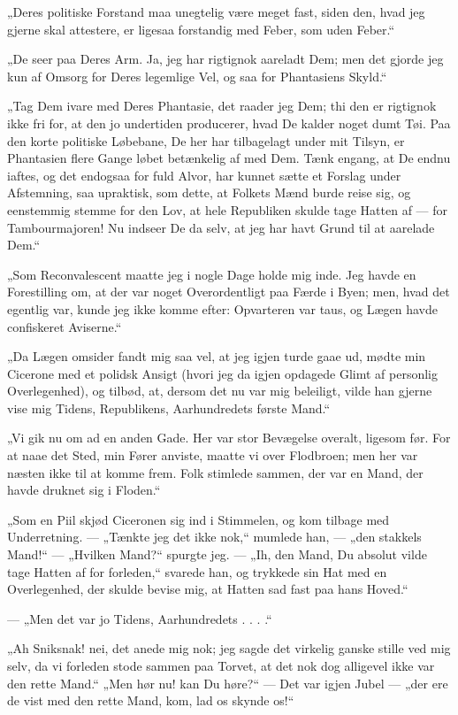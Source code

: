 \documentclass[12pt,a4paper]{book}
\newcommand{\apage}[1]{\marginnote{\footnotesize\textit{[#1]}}}
\begin{document}
„Deres politiske Forstand maa unegtelig være meget fast, siden den,
hvad jeg gjerne skal attestere, er ligesaa forstandig med Feber, som
uden Feber.“

„De seer paa Deres Arm. Ja, jeg har rigtignok aareladt Dem; men det
gjorde jeg kun af Omsorg for Deres legemlige Vel, og saa for
Phantasiens Skyld.“

„Tag Dem ivare med Deres Phantasie, det raader jeg Dem; thi den er
rigtignok ikke fri for, at den jo undertiden producerer, hvad De
kalder noget dumt Tøi. Paa den korte politiske Løbebane, De her har
tilbagelagt under mit Tilsyn, er Phantasien flere Gange løbet
betænkelig af med Dem. Tænk engang, at De endnu iaftes, og det
endogsaa for fuld Alvor, har kunnet sætte et Forslag under
Afstemning, saa upraktisk, som dette, at Folkets Mænd burde reise
sig, og eenstemmig stemme for den Lov, at hele Republiken skulde tage
Hatten af --- for Tambourmajoren! Nu indseer De da selv, at jeg har
havt Grund til at aarelade Dem.“

„Som Reconvalescent maatte jeg i nogle Dage holde mig inde. Jeg havde
en Forestilling om, at der var noget Overordentligt paa Færde i
Byen; men, hvad det egentlig var, kunde jeg ikke komme efter:
Opvarteren var taus, og Lægen havde confiskeret Aviserne.“

„Da Lægen omsider fandt mig saa vel, at jeg igjen turde gaae ud,
mødte min Cicerone med et polidsk Ansigt (hvori jeg da igjen
opdagede Glimt af personlig Overlegenhed), og \apage{61}
tilbød, at, dersom det nu var mig beleiligt, vilde han gjerne vise
mig Tidens, Republikens, Aarhundredets første Mand.“

„Vi gik nu om ad en anden Gade. Her var stor Bevægelse overalt,
ligesom før. For at naae det Sted, min Fører anviste, maatte vi over
Flodbroen; men her var næsten ikke til at komme frem. Folk stimlede
sammen, der var en Mand, der havde druknet sig i Floden.“

„Som en Piil skjød Ciceronen sig ind i Stimmelen, og kom tilbage med
Underretning. --- „Tænkte jeg det ikke nok,“ mumlede han, --- „den
stakkels Mand!“ --- „Hvilken Mand?“ spurgte jeg. --- „Ih, den Mand,
Du absolut vilde tage Hatten af for forleden,“ svarede han, og
trykkede sin Hat med en Overlegenhed, der skulde bevise mig, at
Hatten sad fast paa hans Hoved.“

--- „Men det var jo Tidens, Aarhundredets . . . .“

„Ah Sniksnak! nei, det anede mig nok; jeg sagde det virkelig ganske
stille ved mig selv, da vi forleden stode sammen paa Torvet, at det
nok dog alligevel ikke var den rette Mand.“ „Men hør nu! kan Du
høre?“ --- Det var igjen Jubel --- „der ere de vist med den rette
Mand, kom, lad os skynde os!“
\end{document}
